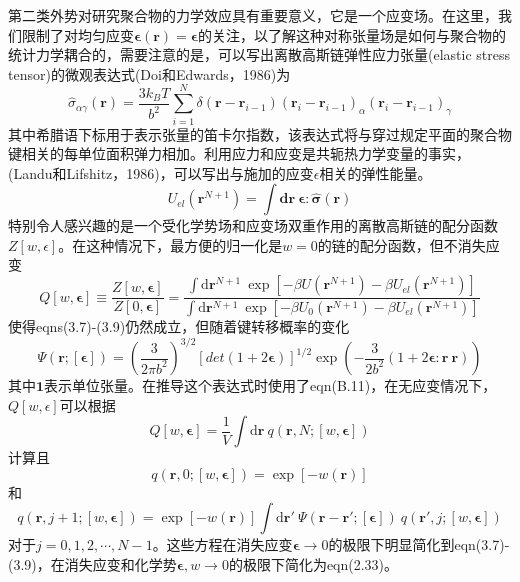 第二类外势对研究聚合物的力学效应具有重要意义，它是一个应变场。在这里，我们限制了对均匀应变$\boldsymbol{\epsilon}(\mathbf{r})=\boldsymbol{\epsilon}$的关注，以了解这种对称张量场是如何与聚合物的统计力学耦合的，需要注意的是，可以写出离散高斯链弹性应力张量(elastic stress tensor)的微观表达式(Doi和Edwards，1986)为
\begin{equation}
\hat{\sigma}_{\alpha\gamma}(\mathbf{r})=\frac{3k_BT}{b^2}\sum\limits_{i=1}^N\delta(\mathbf{r}-\mathbf{r}_{i-1})(\mathbf{r}_{i}-\mathbf{r}_{i-1})_{\alpha}(\mathbf{r}_i-\mathbf{r}_{i-1})_{\gamma}
\end{equation}
其中希腊语下标用于表示张量的笛卡尔指数，该表达式将与穿过规定平面的聚合物键相关的每单位面积弹力相加。利用应力和应变是共轭热力学变量的事实，(Landu和Lifshitz，1986)，可以写出与施加的应变$\epsilon$相关的弹性能量。
\begin{equation}
U_{el}(\mathbf{r}^{N+1})=\int\mathbf{d}\mathbf{r}~\boldsymbol{\epsilon}:\hat{\boldsymbol{\sigma}}(\mathbf{r})
\end{equation}
特别令人感兴趣的是一个受化学势场和应变场双重作用的离散高斯链的配分函数$Z[w,\epsilon]$。在这种情况下，最方便的归一化是$w=0$的链的配分函数，但不消失应变
\begin{equation}
Q[w,\boldsymbol{\epsilon}]\equiv\frac{Z[w,\boldsymbol{\epsilon}]}{Z[0,\boldsymbol{\epsilon}]}=\frac{\int\mathrm{d}\mathbf{r}^{N+1}~\exp[-\beta U(\mathbf{r}^{N+1})-\beta U_{el}(\mathbf{r}^{N+1})]}{\int\mathrm{d}\mathbf{r}^{N+1}~\exp[-\beta U_0(\mathbf{r}^{N+1})-\beta U_{el}(\mathbf{r}^{N+1})]}
\end{equation}
使得eqns(3.7)-(3.9)仍然成立，但随着键转移概率的变化
\begin{equation}
\Psi(\mathbf{r};[\boldsymbol{\epsilon}])=\left(\frac{3}{2\pi b^2}\right)^{3/2}[det(1+2\boldsymbol{\epsilon})]^{1/2}\exp\left(-\frac{3}{2b^2}(1+2\boldsymbol{\epsilon}:\mathbf{r}~\mathbf{r})\right)
\end{equation}
其中$\boldsymbol{1}$表示单位张量。在推导这个表达式时使用了eqn(B.11)，在无应变情况下，$Q[w,\epsilon]$可以根据
\begin{equation}
Q[w,\boldsymbol{\epsilon}]=\frac{1}{V}\int\mathrm{d}\mathbf{r}~q(\mathbf{r},N;[w,\boldsymbol{\epsilon}])
\end{equation}
计算且
\begin{equation}
q(\mathbf{r},0;[w,\boldsymbol{\epsilon}])=\exp[-w(\mathbf{r})]
\end{equation}
和
\begin{equation}
q(\mathbf{r},j+1;[w,\boldsymbol{\epsilon}])=\exp[-w(\mathbf{r})]\int\mathrm{d}\mathbf{r}'~\Psi(\mathbf{r}-\mathbf{r}';[\boldsymbol{\epsilon}])~q(\mathbf{r}',j;[w,\boldsymbol{\epsilon}])
\end{equation}
对于$j=0,1,2,\cdots,N-1$。这些方程在消失应变$\boldsymbol{\epsilon}\rightarrow 0$的极限下明显简化到eqn(3.7)-(3.9)，在消失应变和化学势$\boldsymbol{\epsilon},w\rightarrow 0$的极限下简化为eqn(2.33)。
